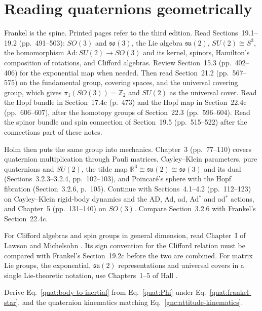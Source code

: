 \section{Reading quaternions geometrically}
Frankel \cite{TFrankel2012} is the spine. Printed pages refer to the third
edition. Read Sections~19.1--19.2 (pp.~491--503): $SO(3)$ and
$\mathfrak{so}(3)$, the Lie algebra $\mathfrak{su}(2)$, $SU(2)\cong S^3$,
the homomorphism $\mathrm{Ad}\colon SU(2)\to SO(3)$ and its kernel,
spinors, Hamilton's composition of rotations, and Clifford algebras.
Review Section~15.3 (pp.~402--406) for the exponential map when needed.
Then read Section~21.2 (pp.~567--575) on the fundamental group, covering
spaces, and the universal covering group, which gives
$\pi_1(SO(3))=\mathbb Z_2$ and $SU(2)$ as the universal cover.
Read the Hopf bundle in Section~17.4c (p.~473) and the Hopf map in
Section~22.4c (pp.~606--607), after the homotopy groups of
Section~22.3 (pp.~596--604). Read the spinor bundle and spin connection of
Section~19.5 (pp.~515--522) after the connections part of these notes.

Holm \cite{DDHolm2011} then puts the same group into mechanics.
Chapter~3 (pp.~77--110) covers quaternion multiplication through Pauli
matrices, Cayley--Klein parameters, pure quaternions and $SU(2)$, the tilde
map $\mathbb R^3\cong\mathfrak{su}(2)\cong\mathfrak{so}(3)$ and its dual
(Sections~3.2.3--3.2.4, pp.~102--103), and Poincar\'e's sphere with the
Hopf fibration (Section~3.2.6, p.~105). Continue with Sections~4.1--4.2
(pp.~112--123) on Cayley--Klein rigid-body dynamics and the AD, Ad, ad,
Ad$^*$ and ad$^*$ actions, and Chapter~5 (pp.~131--140) on $SO(3)$.
Compare Section~3.2.6 with Frankel's Section~22.4c.

For Clifford algebras and spin groups in general dimension, read Chapter~I
of Lawson and Michelsohn \cite{HBLawsonMLMichelsohn1989}. Its sign
convention for the Clifford relation must be compared with Frankel's
Section~19.2c before the two are combined. For matrix Lie groups, the
exponential, $\mathfrak{su}(2)$ representations and universal covers in a
single Lie-theoretic notation, use Chapters~1--5 of Hall \cite{BCHall2015}.

Derive Eq.~\eqref{quat:body-to-inertial} from Eq.~\eqref{quat:Phi} under
Eq.~\eqref{quat:frankel-star}, and the quaternion kinematics matching
Eq.~\eqref{gnc:attitude-kinematics}.
